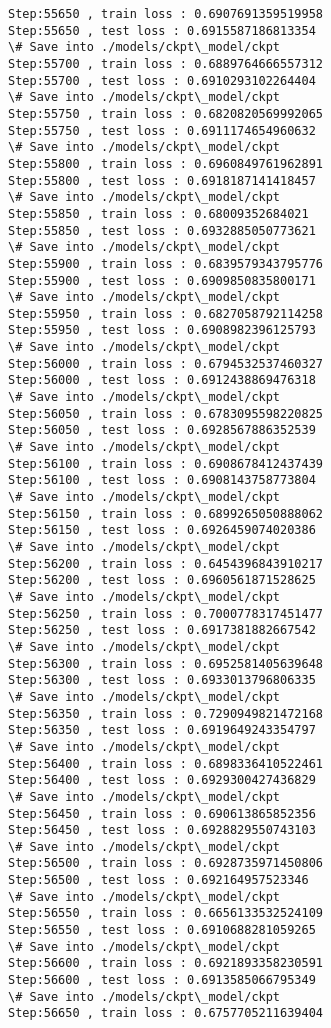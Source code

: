 \documentclass[11pt]{article}
\begin{document}
\begin{Verbatim}[commandchars=\\\{\}]
Step:55650 , train loss : 0.6907691359519958
Step:55650 , test loss : 0.6915587186813354
\# Save into ./models/ckpt\_model/ckpt
Step:55700 , train loss : 0.6889764666557312
Step:55700 , test loss : 0.6910293102264404
\# Save into ./models/ckpt\_model/ckpt
Step:55750 , train loss : 0.6820820569992065
Step:55750 , test loss : 0.6911174654960632
\# Save into ./models/ckpt\_model/ckpt
Step:55800 , train loss : 0.6960849761962891
Step:55800 , test loss : 0.6918187141418457
\# Save into ./models/ckpt\_model/ckpt
Step:55850 , train loss : 0.68009352684021
Step:55850 , test loss : 0.6932885050773621
\# Save into ./models/ckpt\_model/ckpt
Step:55900 , train loss : 0.6839579343795776
Step:55900 , test loss : 0.6909850835800171
\# Save into ./models/ckpt\_model/ckpt
Step:55950 , train loss : 0.6827058792114258
Step:55950 , test loss : 0.6908982396125793
\# Save into ./models/ckpt\_model/ckpt
Step:56000 , train loss : 0.6794532537460327
Step:56000 , test loss : 0.6912438869476318
\# Save into ./models/ckpt\_model/ckpt
Step:56050 , train loss : 0.6783095598220825
Step:56050 , test loss : 0.6928567886352539
\# Save into ./models/ckpt\_model/ckpt
Step:56100 , train loss : 0.6908678412437439
Step:56100 , test loss : 0.6908143758773804
\# Save into ./models/ckpt\_model/ckpt
Step:56150 , train loss : 0.6899265050888062
Step:56150 , test loss : 0.6926459074020386
\# Save into ./models/ckpt\_model/ckpt
Step:56200 , train loss : 0.6454396843910217
Step:56200 , test loss : 0.6960561871528625
\# Save into ./models/ckpt\_model/ckpt
Step:56250 , train loss : 0.7000778317451477
Step:56250 , test loss : 0.6917381882667542
\# Save into ./models/ckpt\_model/ckpt
Step:56300 , train loss : 0.6952581405639648
Step:56300 , test loss : 0.6933013796806335
\# Save into ./models/ckpt\_model/ckpt
Step:56350 , train loss : 0.7290949821472168
Step:56350 , test loss : 0.6919649243354797
\# Save into ./models/ckpt\_model/ckpt
Step:56400 , train loss : 0.6898336410522461
Step:56400 , test loss : 0.6929300427436829
\# Save into ./models/ckpt\_model/ckpt
Step:56450 , train loss : 0.690613865852356
Step:56450 , test loss : 0.6928829550743103
\# Save into ./models/ckpt\_model/ckpt
Step:56500 , train loss : 0.6928735971450806
Step:56500 , test loss : 0.692164957523346
\# Save into ./models/ckpt\_model/ckpt
Step:56550 , train loss : 0.6656133532524109
Step:56550 , test loss : 0.6910688281059265
\# Save into ./models/ckpt\_model/ckpt
Step:56600 , train loss : 0.6921893358230591
Step:56600 , test loss : 0.6913585066795349
\# Save into ./models/ckpt\_model/ckpt
Step:56650 , train loss : 0.6757705211639404

\end{Verbatim}
\end{document}
